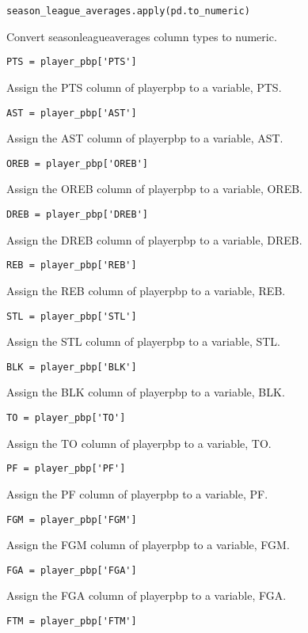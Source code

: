 \documentclass{article}
\begin{document}
\begin{lstlisting}
season_league_averages.apply(pd.to_numeric)
\end{lstlisting}
Convert season\textunderscore league\textunderscore averages column types to numeric.
\begin{lstlisting}
PTS = player_pbp['PTS']
\end{lstlisting}
Assign the PTS column of player\textunderscore pbp to a variable, PTS.
\begin{lstlisting}
AST = player_pbp['AST']
\end{lstlisting}
Assign the AST column of player\textunderscore pbp to a variable, AST.
\begin{lstlisting}
OREB = player_pbp['OREB']
\end{lstlisting}
Assign the OREB column of player\textunderscore pbp to a variable, OREB.
\begin{lstlisting}
DREB = player_pbp['DREB']
\end{lstlisting}
Assign the DREB column of player\textunderscore pbp to a variable, DREB.
\begin{lstlisting}
REB = player_pbp['REB']
\end{lstlisting}
Assign the REB column of player\textunderscore pbp to a variable, REB.
\begin{lstlisting}
STL = player_pbp['STL']
\end{lstlisting}
Assign the STL column of player\textunderscore pbp to a variable, STL.
\begin{lstlisting}
BLK = player_pbp['BLK']
\end{lstlisting}
Assign the BLK column of player\textunderscore pbp to a variable, BLK.
\begin{lstlisting}
TO = player_pbp['TO']
\end{lstlisting}
Assign the TO column of player\textunderscore pbp to a variable, TO.
\begin{lstlisting}
PF = player_pbp['PF']
\end{lstlisting}
Assign the PF column of player\textunderscore pbp to a variable, PF.
\begin{lstlisting}
FGM = player_pbp['FGM']
\end{lstlisting}
Assign the FGM column of player\textunderscore pbp to a variable, FGM.
\begin{lstlisting}
FGA = player_pbp['FGA']
\end{lstlisting}
Assign the FGA column of player\textunderscore pbp to a variable, FGA.
\begin{lstlisting}
FTM = player_pbp['FTM']
\end{lstlisting}
\end{document}
